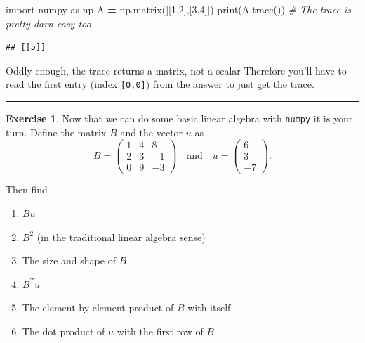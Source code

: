 \documentclass[
]{book}
\newenvironment{Shaded}{\begin{snugshade}}{\end{snugshade}}
\newcommand{\BuiltInTok}[1]{#1}
\newcommand{\CommentTok}[1]{\textcolor[rgb]{0.56,0.35,0.01}{\textit{#1}}}
\newcommand{\DecValTok}[1]{\textcolor[rgb]{0.00,0.00,0.81}{#1}}
\newcommand{\ImportTok}[1]{#1}
\newcommand{\NormalTok}[1]{#1}
\newcommand{\OperatorTok}[1]{\textcolor[rgb]{0.81,0.36,0.00}{\textbf{#1}}}
\providecommand{\tightlist}{%
  \setlength{\itemsep}{0pt}\setlength{\parskip}{0pt}}
\theoremstyle{definition}
\theoremstyle{definition}
\theoremstyle{definition}
\newtheorem{exercise}{Exercise}[chapter]
\theoremstyle{remark}
\begin{document}
\begin{Shaded}
\begin{Highlighting}[]
\ImportTok{import}\NormalTok{ numpy }\ImportTok{as}\NormalTok{ np}
\NormalTok{A }\OperatorTok{=}\NormalTok{ np.matrix([[}\DecValTok{1}\NormalTok{,}\DecValTok{2}\NormalTok{],[}\DecValTok{3}\NormalTok{,}\DecValTok{4}\NormalTok{]])}
\BuiltInTok{print}\NormalTok{(A.trace()) }\CommentTok{\# The trace is pretty darn easy too}
\end{Highlighting}
\end{Shaded}

\begin{verbatim}
## [[5]]
\end{verbatim}

Oddly enough, the trace returns a matrix, not a scalar Therefore you'll
have to read the first entry (index \texttt{{[}0,0{]}}) from the answer to just get
the trace.

\begin{center}\rule{0.5\linewidth}{0.5pt}\end{center}

\begin{exercise}
\protect\hypertarget{exr:unnamed-chunk-737}{}{\label{exr:unnamed-chunk-737} }Now that we can do some basic linear algebra with \texttt{numpy} it is your turn. Define the matrix \(B\) and the vector \(u\) as\\
\[B = \begin{pmatrix} 1 & 4 & 8 \\ 2 & 3 & -1 \\ 0 & 9 & -3 \end{pmatrix} \quad \text{and} \quad u = \begin{pmatrix} 6 \\ 3 \\ -7 \end{pmatrix}.\]

Then find

\begin{enumerate}
\def\labelenumi{\alph{enumi}.}
\tightlist
\item
  \(Bu\)
\item
  \(B^2\) (in the traditional linear algebra sense)
\item
  The size and shape of \(B\)
\item
  \(B^T u\)
\item
  The element-by-element product of \(B\) with itself
\item
  The dot product of \(u\) with the first row of \(B\)
\end{enumerate}
\end{exercise}
\end{document}

